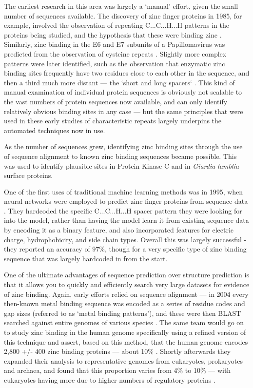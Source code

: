 The earliest research in this area was largely a `manual' effort, given the small number of sequences available. The discovery of zinc finger proteins in 1985, for example, involved the observation of repeating C...C...H...H patterns in the proteins being studied, and the hypothesis that these were binding zinc \cite{miller1985repetitive}. Similarly, zinc binding in the E6 and E7 subunits of a Papillomavirus was predicted from the observation of cysteine repeats \cite{barbosa1989papillomavirus}. Slightly more complex patterns were later identified, such as the observation that enzymatic zinc binding sites frequently have two residues close to each other in the sequence, and then a third much more distant --- the `short and long spacers` \cite{vallee1989short}. This kind of manual examination of individual protein sequences is obviously not scalable to the vast numbers of protein sequences now available, and can only identify relatively obvious binding sites in any case --- but the same principles that were used in these early studies of characteristic repeats largely underpins the automated techniques now in use.

As the number of sequences grew, identifying zinc binding sites through the use of sequence alignment to known zinc binding sequences became possible. This was used to identify plausible sites in Protein Kinase C \cite{bishop1991identification} and in {\it Giardia lamblia} surface proteins.

One of the first uses of traditional machine learning methods was in 1995, when neural networks were employed to predict zinc finger proteins from sequence data \cite{nakata1995prediction}. They hardcoded the specific C...C...H...H spacer pattern they were looking for into the model, rather than having the model learn it from existing sequence data by encoding it as a binary feature, and also incorporated features for electric charge, hydrophobicity, and side chain types. Overall this was largely successful - they reported an accuracy of 97\%, though for a very specific type of zinc binding sequence that was largely hardcoded in from the start.

One of the ultimate advantages of sequence prediction over structure prediction is that it allows you to quickly and efficiently search very large datasets for evidence of zinc binding. Again, early efforts relied on sequence alignment --- in 2004 every then-known metal binding sequence was encoded as a series of residue codes and gap sizes (referred to as `metal binding patterns'), and these were then BLAST searched against entire genomes of various species \cite{andreini2004hint}. The same team would go on to study zinc binding in the human genome specifically using a refined version of this technique and assert, based on this method, that the human genome encodes 2,800 +/- 400 zinc binding proteins --- about 10\% \cite{andreini2006counting}. Shortly afterwards they expanded their analysis to representative genomes from eukaryotes, prokaryotes and archaea, and found that this proportion varies from 4\% to 10\% --- with eukaryotes having more due to higher numbers of regulatory proteins \cite{passerini2007predicting}.

